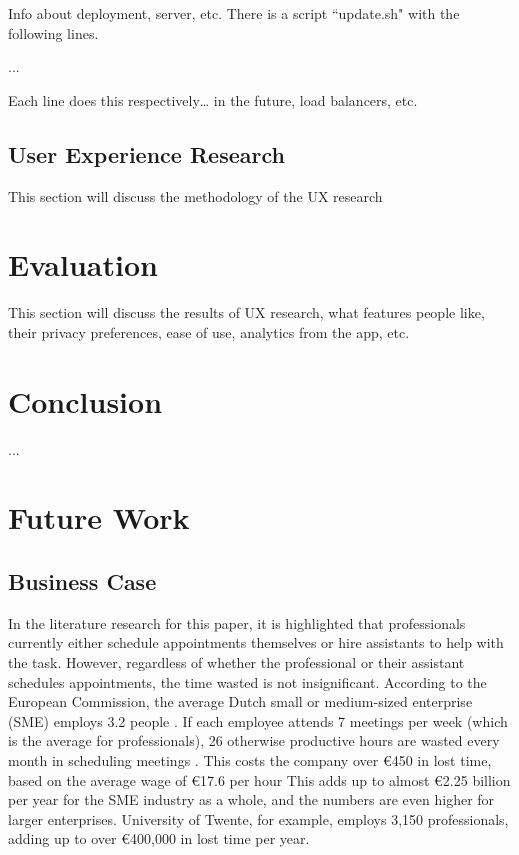 \documentclass{article}
\begin{document}
Info about deployment, server, etc. There is a script ``update.sh" with the following lines.

...


Each line does this respectively… in the future, load balancers, etc.

\subsection{User Experience Research}

This section will discuss the methodology of the UX research

\newpage

\section{Evaluation}

This section will discuss the results of UX research, what features people like, their privacy preferences, ease of use, analytics from the app, etc.

\newpage

\section{Conclusion}

...

\newpage

\section{Future Work}

\subsection{Business Case}

In the literature research for this paper, it is highlighted that professionals currently either schedule appointments themselves or hire assistants to help with the task. However, regardless of whether the professional or their assistant schedules appointments, the time wasted is not insignificant. According to the European Commission, the average Dutch small or medium-sized enterprise (SME) employs 3.2 people \cite{noauthor_2019_2019}. If each employee attends 7 meetings per week (which is the average for professionals), 26 otherwise productive hours are wasted every month in scheduling meetings \cite{kincaid_electronic_1985}. This costs the company over €450 in lost time, based on the average wage of €17.6 per hour \cite{noauthor_salary_nodate} This adds up to almost €2.25 billion per year for the SME industry as a whole, and the numbers are even higher for larger enterprises. University of Twente, for example, employs 3,150 professionals, adding up to over €400,000 in lost time per year.
\end{document}
